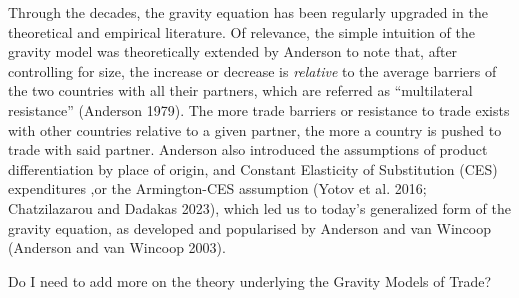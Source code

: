 \documentclass{article}%
\begin{document}
Through the decades, the gravity equation has been regularly upgraded in
the theoretical and empirical literature. Of relevance, the simple
intuition of the gravity model was theoretically extended by Anderson to
note that, after controlling for size, the increase or decrease is
\emph{relative} to the average barriers of the two countries with all
their partners, which are referred as ``multilateral resistance''
(Anderson 1979). The more trade barriers or resistance to trade exists
with other countries relative to a given partner, the more a country is
pushed to trade with said partner. Anderson also introduced the
assumptions of product differentiation by place of origin, and Constant
Elasticity of Substitution (CES) expenditures ,or the Armington-CES
assumption (Yotov et al. 2016; Chatzilazarou and Dadakas 2023), which
led us to today's generalized form of the gravity equation, as developed
and popularised by Anderson and van Wincoop (Anderson and van Wincoop
2003).

Do I need to add more on the theory underlying the Gravity Models of
Trade?
\end{document}
